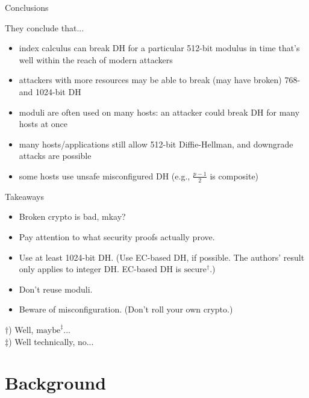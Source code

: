 \documentclass[presentation, aspectratio=54]{beamer}
\begin{document}
\begin{frame}{Conclusions}

They conclude that...
\begin{itemize}
\item index calculus can break DH for a particular 512-bit modulus in time
      that's well within the reach of modern attackers
\item attackers with more resources may be able to break (may have broken) 768-
      and 1024-bit DH
\item moduli are often used on many hosts: an attacker could break DH for many
      hosts at once
\item many hosts/applications still allow 512-bit Diffie-Hellman, and downgrade
      attacks are possible
\item some hosts use unsafe misconfigured DH (e.g., $\frac{p-1}{2}$ is composite)
\end{itemize}

\end{frame}


\begin{frame}{Takeaways}

\begin{itemize}
\item Broken crypto is bad, mkay?
\item Pay attention to what security proofs actually prove.
\item Use at least 1024-bit DH. (Use EC-based DH, if possible. The authors'
      result only applies to integer DH. EC-based DH is
      $\text{secure}^{\dagger}$.)
\item Don't reuse moduli.
\item Beware of misconfiguration. (Don't roll your own crypto.)
\end{itemize}

\vspace{20pt}
{
\footnotesize
\pause
$\dagger$)  Well, $\text{maybe}^{\ddagger}$... \\
\pause
$\ddagger$) Well technically, no...
}

\end{frame}


\section{Background}
\end{document}
